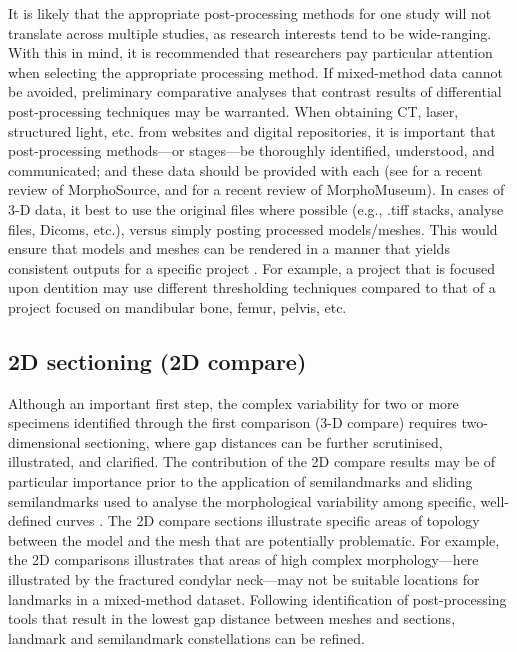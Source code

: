 \documentclass[review]{elsarticle}
\begin{document}
It is likely that the appropriate post-processing methods for one study will not translate across multiple studies, as research interests tend to be wide-ranging. With this in mind, it is recommended that researchers pay particular attention when selecting the appropriate processing method. If mixed-method data cannot be avoided, preliminary comparative analyses that contrast results of differential post-processing techniques may be warranted. When obtaining CT, laser, structured light, etc. from websites and digital repositories, it is important that post-processing methods---or stages---be thoroughly identified, understood, and communicated; and these data should be provided with each (see \cite{RN11502} for a recent review of MorphoSource, and \cite{RN11503} for a recent review of MorphoMuseum). In cases of 3-D data, it best to use the original files where possible (e.g., .tiff stacks, analyse files, Dicoms, etc.), versus simply posting processed models/meshes. This would ensure that models and meshes can be rendered in a manner that yields consistent outputs for a specific project \citep{RN8984}. For example, a project that is focused upon dentition may use different thresholding techniques compared to that of a project focused on mandibular bone, femur, pelvis, etc.

\subsection{2D sectioning (2D compare)}

Although an important first step, the complex variability for two or more specimens identified through the first comparison (3-D compare) requires two-dimensional sectioning, where gap distances can be further scrutinised, illustrated, and clarified. The contribution of the 2D compare results may be of particular importance prior to the application of semilandmarks \citep{RN4772,RN1768} and sliding semilandmarks used to analyse the morphological variability among specific, well-defined curves \citep{RN5921,RN5920}. The 2D compare sections illustrate specific areas of topology between the model and the mesh that are potentially problematic. For example, the 2D comparisons illustrates that areas of high complex morphology---here illustrated by the fractured condylar neck---may not be suitable locations for landmarks in a mixed-method dataset. Following identification of post-processing tools that result in the lowest gap distance between meshes and sections, landmark and semilandmark constellations can be refined.
\end{document}
